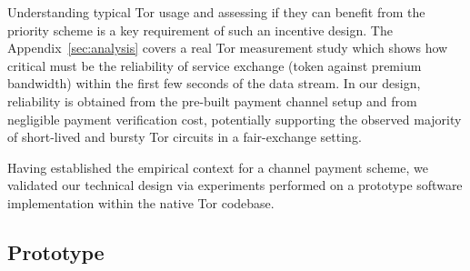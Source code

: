 Understanding typical Tor usage and assessing if they can benefit from the 
priority scheme is a key requirement of such an incentive design. The 
Appendix~\ref{sec:analysis} covers a real Tor measurement study which 
shows how critical must be the reliability of service exchange (token 
against premium bandwidth) within the 
first few seconds of the data stream. In our design, reliability is 
obtained from the pre-built payment channel setup and from negligible 
payment verification cost, potentially supporting the observed majority of 
short-lived and bursty Tor circuits in a fair-exchange setting. 

Having established the empirical context for a channel payment scheme, we
validated our technical design via experiments performed on a prototype software
implementation within the native Tor codebase.

\subsection{Prototype}

